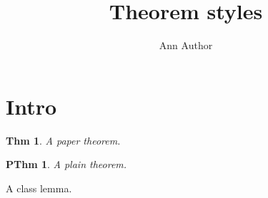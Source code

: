 \documentclass[AMA,STIX1COL]{WileyNJD-v2}
\newtheorem{thm}{Thm}
\theoremstyle{plain}
\newtheorem{pthm}{PThm}
\begin{document}
\title{Theorem styles}
\author{Ann Author}
\maketitle
\section{Intro}
\begin{thm}A paper theorem.\end{thm}
\begin{pthm}A plain theorem.\end{pthm}
\begin{lemma}A class lemma.\end{lemma}
\end{document}
